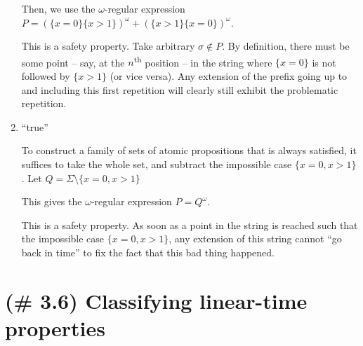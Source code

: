 \documentclass[letterpaper,11pt]{article}
\begin{document}
\begin{enumerate}
        Then, we use the $\omega$-regular expression
        $P = (\{x=0\}\{x>1\})^\omega + (\{x>1\}\{x=0\})^\omega$.

        This is a safety property. Take arbitrary $\sigma \notin P$. By
        definition, there must be some point -- say, at the
        $n$\textsuperscript{th} position -- in the string where $\{x = 0\}$ is
        not followed by $\{x > 1\}$ (or vice versa). Any extension of the
        prefix going up to and including this first repetition will clearly
        still exhibit the problematic repetition.

    \item ``true''

        To construct a family of sets of atomic propositions that is always
        satisfied, it suffices to take the whole set, and subtract the
        impossible case $\{x=0, x>1\}$. Let
        $Q = \Sigma \setminus \{x = 0, x > 1\}$

        This gives the $\omega$-regular expression
        $P = Q^\omega$.

        This is a safety property. As soon as a point in the string is reached
        such that the impossible case $\{x = 0, x > 1\}$, any extension of this
        string cannot ``go back in time'' to fix the fact that this bad thing
        happened.
\end{enumerate}

\section{(\# 3.6) Classifying linear-time properties}
\end{document}
